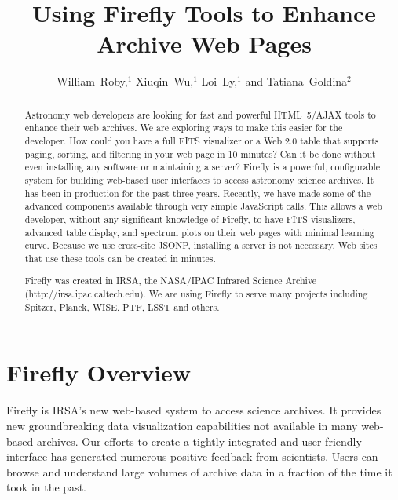 
\resetcounters


\title{Using Firefly Tools to Enhance Archive Web Pages}
\author{William~Roby,$^1$ Xiuqin~Wu,$^1$ Loi~Ly,$^1$ and Tatiana~Goldina$^2$
}


\begin{abstract}
Astronomy web developers are looking for fast and powerful \newline HTML~5/AJAX tools to enhance their web archives. We are exploring ways to make this easier for the developer. How could you have a full FITS visualizer or a Web 2.0 table that supports paging, sorting, and filtering in your web page in 10 minutes? Can it be done without even installing any software or maintaining a server?
Firefly is a powerful, configurable system for building web-based user interfaces to access astronomy science archives. It has been in
production for the past three years. Recently, we have made some of the advanced components available through very simple JavaScript
calls. 
This allows a web developer, without any significant knowledge of Firefly, to have FITS visualizers, advanced table display, and spectrum plots on their web pages with minimal learning curve. 
Because we use cross-site JSONP, installing a server is not necessary. Web sites that use these tools can be created in minutes.

Firefly was created in IRSA, the NASA/IPAC Infrared Science Archive \newline (http://irsa.ipac.caltech.edu).
We are using Firefly to serve many projects including Spitzer, Planck, WISE, PTF, LSST and others. 

\end{abstract}

\section*{Firefly Overview}
Firefly is IRSA's new web-based system to access science archives. 
It provides new groundbreaking data visualization capabilities not available in many web-based archives. 
Our efforts to create a tightly integrated and user-friendly interface has generated numerous positive feedback from scientists. 
Users can browse and understand large volumes of archive data in a fraction of the time it took in the past.

